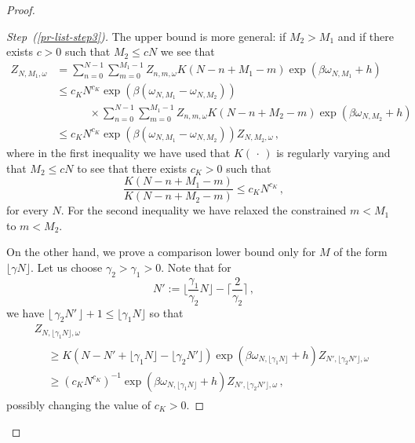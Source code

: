 \documentclass[AHL,Unicode,longabstracts]{cedram}
\newenvironment{step}[1]{\begin{proof}[#1]}{\let\qed\relax\end{proof}}
\newcommand{\gb}{\beta}
\newcommand{\go}{\omega}
\begin{document}
\begin{proof}
\begin{step}{Step~(\ref{pr-list-step3})}
The upper bound is more general: if $M_2> M_1$ and if there exists $c>0$ such that $M_2 \le c N$ we see that
\begin{equation}\label{eq:comparison-upper}
\begin{split}
Z_{N, M_1, \go} & = \sum_{n=0}^{N-1} \sum_{m=0}^{M_1-1} Z_{n, m, \go} K(N-n+M_1-m) \exp\left(\gb \go_{N, M_1} +h\right)
\\
&\le c_K N^{c_K} \exp\left(\gb (\go_{N, M_1}-\go_{N, M_2}) \right)
\\ & \quad \qquad \times
\sum_{n=0}^{N-1} \sum_{m=0}^{M_1-1} Z_{n, m, \go} K(N-n+M_2-m) \exp\left(\gb \go_{N, M_2} +h\right)
\\ &\le c_K N^{c_K} \exp\left(\gb (\go_{N, M_1}-\go_{N, M_2}) \right) Z_{N, M_2, \go}\,,
\end{split}
\end{equation}
where in the first inequality we have used that $K({\,\cdot\,})$ is regularly varying and that $M_2 \le cN$ to see that there exists $c_K>0$ such that
\begin{equation}
\frac{K(N-n+M_1-m)}{K(N-n+M_2-m)} \le c_K N^{c_K}\,,
\end{equation}
for every $N$. For the second inequality we have relaxed the constrained $m< M_1$ to $m<M_2$.

On the other hand, we prove a comparison lower bound only for $M$ of the form $\lfloor \gamma N \rfloor$. Let us choose $\gamma_2>\gamma_1>0$. Note that for
\begin{equation}
N' := \Big \lfloor \frac{\gamma_1}{\gamma_2}N \Big \rfloor - \Big \lceil \frac{2}{\gamma_2} \Big \rceil\,,
\end{equation}
we have $\lfloor\,\gamma_2 N'\,\rfloor +1 \le \lfloor \gamma_1 N \rfloor $ so that
\begin{multline}\label{eq:comparison-lower}
Z_{N, \lfloor \gamma_1 N \rfloor, \go}\\
\begin{aligned}
&\ge K\left(N-N'+ \lfloor \gamma_1 N \rfloor -\lfloor \gamma_2 N' \rfloor\right)
\exp\left(\gb\go_{N, \lfloor \gamma_1 N \rfloor }+h\right) Z_{N', \lfloor \gamma_2 N' \rfloor, \go}
\\
&\ge \left(c_K N^{c_K}\right)^{-1} \exp\left(\gb\go_{N, \lfloor \gamma_1 N \rfloor }+h\right) Z_{N', \lfloor \gamma_2 N' \rfloor, \go}\,,
\end{aligned}
\end{multline}
possibly changing the value of $c_K>0$.


\end{step}
\end{proof}
\end{document}
